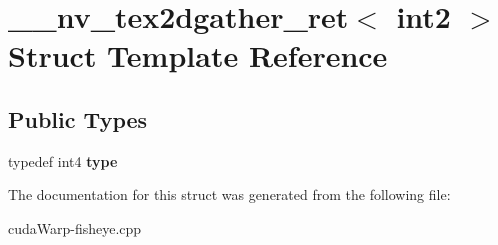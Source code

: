 \hypertarget{struct____nv__tex2dgather__ret_3_01int2_01_4}{}\section{\+\_\+\+\_\+nv\+\_\+tex2dgather\+\_\+ret$<$ int2 $>$ Struct Template Reference}
\label{struct____nv__tex2dgather__ret_3_01int2_01_4}
\subsection*{Public Types}
\begin{DoxyCompactItemize}
\item 
typedef int4 {\bfseries type}\hypertarget{struct____nv__tex2dgather__ret_3_01int2_01_4_a6c4c1828c14e91d65480678d707a2361}{}\label{struct____nv__tex2dgather__ret_3_01int2_01_4_a6c4c1828c14e91d65480678d707a2361}

\end{DoxyCompactItemize}


The documentation for this struct was generated from the following file\+:\begin{DoxyCompactItemize}
\item 
cuda\+Warp-\/fisheye.\+cpp\end{DoxyCompactItemize}
